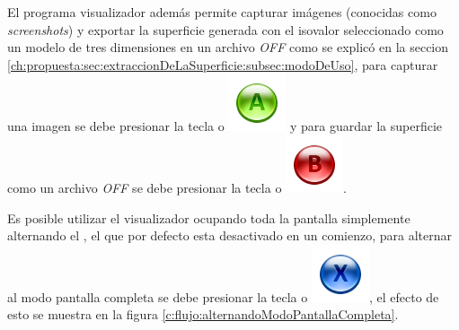 El programa visualizador además permite capturar imágenes (conocidas como \emph{screenshots}) y exportar la superficie generada con el isovalor seleccionado como un modelo de tres dimensiones en un archivo \emph{OFF} como se explicó en la seccion \ref{ch:propuesta:sec:extraccionDeLaSuperficie:subsec:modoDeUso}, para capturar una imagen se debe presionar la tecla  o \includegraphics[scale=0.4, trim= 0 20 0 0]{images/visualizer/xbox360/faceButton0.png} y para guardar la superficie como un archivo \emph{OFF} se debe presionar la tecla  o \includegraphics[scale=0.4, trim= 0 20 0 0]{images/visualizer/xbox360/faceButton1.png}.

Es posible utilizar el visualizador ocupando toda la pantalla simplemente alternando el , el que por defecto esta desactivado en un comienzo, para alternar al modo pantalla completa se debe presionar la tecla  o \includegraphics[scale=0.4, trim= 0 20 0 0]{images/visualizer/xbox360/faceButton2.png}, el efecto de esto se muestra en la figura \ref{c:flujo:alternandoModoPantallaCompleta}.

